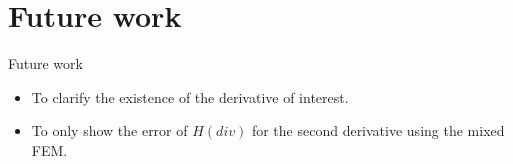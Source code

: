 \documentclass{beamer}
\begin{document}
\section{Future work}
\begin{frame}{Future work}
\vspace{-10em}
\begin{itemize}
 \item To clarify the existence of the derivative of interest.
 \item To only show the error of $H(div)$ for the second derivative using the mixed FEM.
\end{itemize}
\end{frame}



\end{document}
